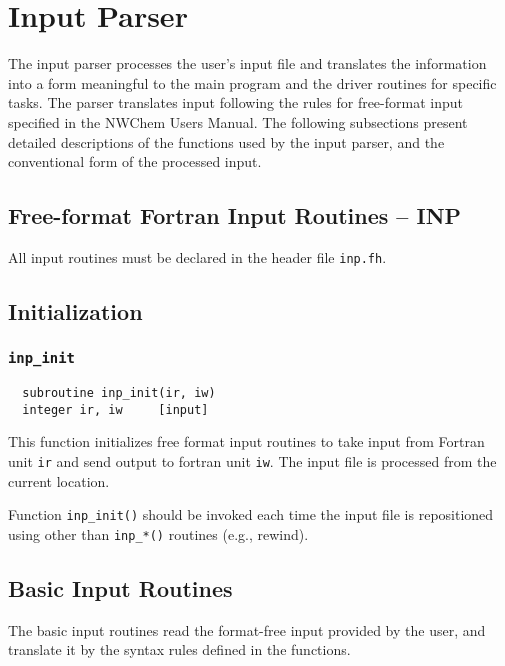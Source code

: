 \section{Input Parser}
\label{sec:parser}

The input parser processes the user's input file and translates the
information into a form meaningful to the main program and the driver routines
for specific tasks.  The parser translates input following the 
rules for free-format input specified in the NWChem Users Manual.  The
following subsections present detailed descriptions of the functions
used by the input parser, and the conventional form of the processed
input.

\subsection{Free-format Fortran Input Routines -- INP}

All input routines must be declared in the header file {\tt inp.fh}.

\subsection{Initialization}

\subsubsection{{\tt inp\_init}}

\begin{verbatim}
  subroutine inp_init(ir, iw)
  integer ir, iw     [input]
\end{verbatim}
This function initializes free format input routines to take input from Fortran unit
{\tt ir} and send output to fortran unit {\tt iw}.  The input
file is processed from the current location.

Function {\tt inp\_init()} should be invoked each time the input file is
repositioned using other than {\tt inp\_*()} routines (e.g., rewind).

\subsection{Basic Input Routines}

The basic input routines read the format-free input provided by the user, and 
translate it by the syntax rules defined in the functions.

